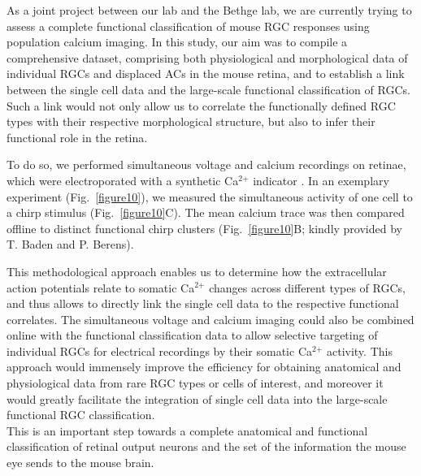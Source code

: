 As a joint project between our lab and the Bethge lab, we are currently trying to assess a complete functional classification of mouse RGC responses using population calcium imaging. In this study, our aim was to compile a comprehensive dataset, comprising both physiological and morphological data of individual RGCs and displaced ACs in the mouse retina, and to establish a link between the single cell data and the large-scale functional classification of RGCs. Such a link would not only allow us to correlate the functionally defined RGC types with their respective morphological structure, but also to infer their functional role in the retina. 

To do so, we performed simultaneous voltage and calcium recordings on retinae, which were electroporated with a synthetic Ca$^{\text{2+}}$ indicator \citep{briggman11}. In an exemplary experiment (Fig.~\ref{figure10}), we measured the simultaneous activity of one cell to a chirp stimulus (Fig.~\ref{figure10}C). The mean calcium trace was then compared offline to distinct functional chirp clusters (Fig.~\ref{figure10}B; kindly provided by T. Baden and P. Berens).  

This methodological approach enables us to determine how the extracellular action potentials relate to somatic Ca$^{\text{2+}}$ changes across different types of RGCs, and thus allows to directly link the single cell data to the respective functional correlates. The simultaneous voltage and calcium imaging could also be combined online with the functional classification data to allow selective targeting of individual RGCs for electrical recordings by their somatic Ca$^{\text{2+}}$ activity. This approach would immensely improve the efficiency for obtaining anatomical and physiological data from rare RGC types or cells of interest, and moreover it would greatly facilitate the integration of single cell data into the large-scale functional RGC classification.\\
This is an important step towards a complete anatomical and functional classification of retinal output neurons and the set of the information the mouse eye sends to the mouse brain.  

